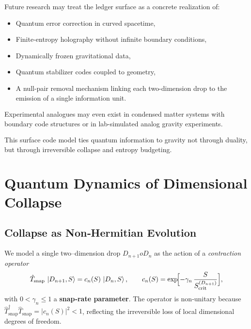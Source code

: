 \documentclass[a4paper, 12pt, oneside]{book}
\numberwithin{equation}{chapter}
\begin{document}
\bigskip
Future research may treat the ledger surface as a concrete realization of:
\begin{itemize}
  \item Quantum error correction in curved spacetime,
  \item Finite-entropy holography without infinite boundary conditions,
  \item Dynamically frozen gravitational data,
  \item Quantum stabilizer codes coupled to geometry,
  \item A null-pair removal mechanism linking each two-dimension drop
        to the emission of a single information unit.
\end{itemize}


Experimental analogues may even exist in condensed matter systems with boundary code structures  
or in lab-simulated analog gravity experiments.

This surface code model ties quantum information to gravity not through duality, but through irreversible collapse and entropy budgeting.


\chapter{Quantum Dynamics of Dimensional Collapse}
\label{appendix:QuantumCollapse}

\section{Collapse as Non‑Hermitian Evolution}
\label{sec:NonHermitian}

We model a single two–dimension drop
$D_{n+1}\!	o\!D_{n}$ as the action of a 
\emph{contraction operator}
\begin{equation}
  \hat T_{\mathrm{snap}}\,\ket{D_{n+1},S}
  = c_n(S)\,\ket{D_n,S},
  \qquad
  c_n(S)=\exp\!\Bigl[-\gamma_n\,\frac{S}{S_{\mathrm{crit}}^{(D_{n+1})}}\Bigr],
  \label{eq:T_snap}
\end{equation}
with $0<\gamma_n\le1$ a 
\textbf{snap‑rate parameter}.  The operator is non‑unitary because
$\hat T_{\mathrm{snap}}^{\dagger}\hat T_{\mathrm{snap}}
 =\lvert c_n(S)\rvert^{2}\!<\!1$, reflecting the irreversible
loss of local dimensional degrees of freedom.
\end{document}
